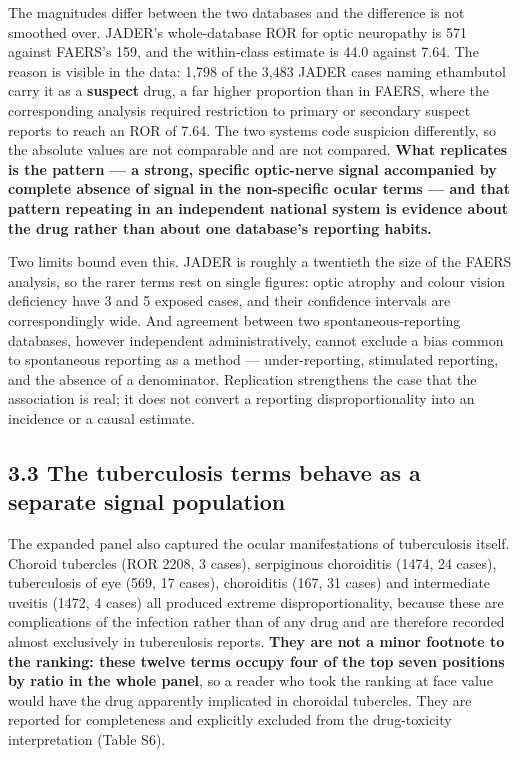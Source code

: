 \documentclass[utf8]{FrontiersinVancouver}
\begin{document}
The magnitudes differ between the two databases and the difference is not smoothed over. JADER's whole-database ROR for optic neuropathy is 571 against FAERS's 159, and the within-class estimate is 44.0 against 7.64. The reason is visible in the data: 1,798 of the 3,483 JADER cases naming ethambutol carry it as a \textbf{suspect} drug, a far higher proportion than in FAERS, where the corresponding analysis required restriction to primary or secondary suspect reports to reach an ROR of 7.64. The two systems code suspicion differently, so the absolute values are not comparable and are not compared. \textbf{What replicates is the pattern --- a strong, specific optic-nerve signal accompanied by complete absence of signal in the non-specific ocular terms --- and that pattern repeating in an independent national system is evidence about the drug rather than about one database's reporting habits.}

Two limits bound even this. JADER is roughly a twentieth the size of the FAERS analysis, so the rarer terms rest on single figures: optic atrophy and colour vision deficiency have 3 and 5 exposed cases, and their confidence intervals are correspondingly wide. And agreement between two spontaneous-reporting databases, however independent administratively, cannot exclude a bias common to spontaneous reporting as a method --- under-reporting, stimulated reporting, and the absence of a denominator. Replication strengthens the case that the association is real; it does not convert a reporting disproportionality into an incidence or a causal estimate.

\subsection{3.3 The tuberculosis terms behave as a separate signal population}

The expanded panel also captured the ocular manifestations of tuberculosis itself. Choroid tubercles (ROR 2208, 3 cases), serpiginous choroiditis (1474, 24 cases), tuberculosis of eye (569, 17 cases), choroiditis (167, 31 cases) and intermediate uveitis (1472, 4 cases) all produced extreme disproportionality, because these are complications of the infection rather than of any drug and are therefore recorded almost exclusively in tuberculosis reports. \textbf{They are not a minor footnote to the ranking: these twelve terms occupy four of the top seven positions by ratio in the whole panel}, so a reader who took the ranking at face value would have the drug apparently implicated in choroidal tubercles. They are reported for completeness and explicitly excluded from the drug-toxicity interpretation (Table S6).
\end{document}
